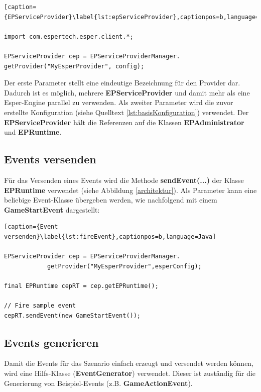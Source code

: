 \begin{lstlisting}[caption={EPServiceProvider}\label{lst:epServiceProvider},captionpos=b,language=JAVA]

import com.espertech.esper.client.*;

EPServiceProvider cep = EPServiceProviderManager.
getProvider("MyEsperProvider", config);

\end{lstlisting}
Der erste Parameter stellt eine eindeutige Bezeichnung für den Provider dar. Dadurch ist es möglich, mehrere \textbf{EPServiceProvider} und damit mehr als eine Esper-Engine parallel zu verwenden. Als zweiter Parameter wird die zuvor  erstellte Konfiguration (siehe Quelltext \ref{lst:basisKonfiguration}) verwendet.
Der \textbf{EPServiceProvider} hält die Referenzen auf die Klassen \textbf{EPAdministrator} und \textbf{EPRuntime}. 

\subsection{Events versenden}
Für das Versenden eines Events wird die Methode \textbf{sendEvent(...)} der Klasse \textbf{EPRuntime} verwendet (siehe Abbildung \ref{architektur}). Als Parameter kann eine beliebige Event-Klasse übergeben werden, wie nachfolgend mit einem \textbf{GameStartEvent} dargestellt:

\begin{lstlisting}[caption={Event versenden}\label{lst:fireEvent},captionpos=b,language=Java]

EPServiceProvider cep = EPServiceProviderManager.
			getProvider("MyEsperProvider",esperConfig);

final EPRuntime cepRT = cep.getEPRuntime();

// Fire sample event
cepRT.sendEvent(new GameStartEvent());
\end{lstlisting}

\subsection{Events generieren}
Damit die Events für das Szenario einfach erzeugt und versendet werden können, wird eine Hilfs-Klasse (\textbf{EventGenerator}) verwendet. Dieser ist zuständig für die Generierung von Beispiel-Events (z.B. \textbf{GameActionEvent}).

